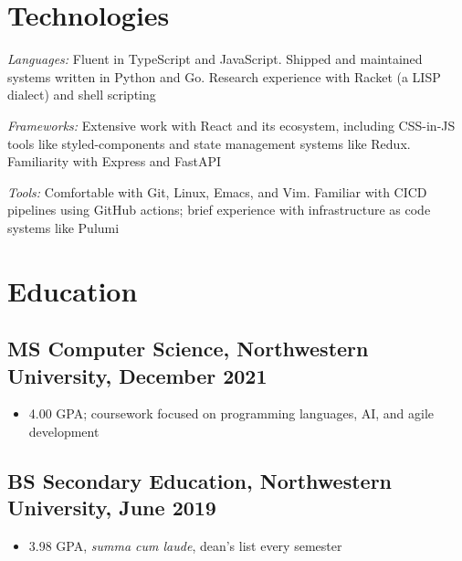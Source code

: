 \documentclass[letterpaper]{article}
\begin{document}
\section*{Technologies}
\emph{Languages:} Fluent in TypeScript and JavaScript. 
Shipped and maintained systems written in Python and Go. 
Research experience with Racket (a LISP dialect) and shell scripting

\emph{Frameworks:} Extensive work with React and its ecosystem, including CSS-in-JS tools like styled-components and state management systems like Redux. Familiarity with Express and FastAPI

\emph{Tools:} Comfortable with Git, Linux, Emacs, and Vim. Familiar with CICD pipelines using GitHub actions; brief experience with infrastructure as code systems like Pulumi
\section*{Education}

\subsection*{MS Computer Science, Northwestern University, December 2021}
\begin{itemize}
\item 4.00 GPA; coursework focused on programming languages, AI, and agile development
\end{itemize}
\subsection*{BS Secondary Education, Northwestern University, June 2019}
\begin{itemize}
  \item 3.98 GPA, \emph{summa cum laude}, dean's list every semester
\end{itemize}
\end{document}
